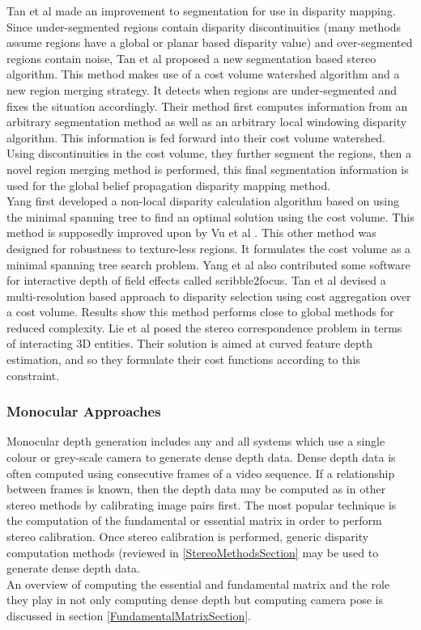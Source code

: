 Tan et al \cite{Tan14Stereo} made an improvement to segmentation for use in disparity mapping. Since under-segmented regions contain disparity discontinuities (many methods assume regions have a global or planar based disparity value) and over-segmented regions contain noise, Tan et al proposed a new segmentation based stereo algorithm. This method makes use of a cost volume watershed algorithm and a new region merging strategy. It detects when regions are under-segmented and fixes the situation accordingly. Their method first computes information from an arbitrary segmentation method as well as an arbitrary local windowing disparity algorithm. This information is fed forward into their cost volume watershed. Using discontinuities in the cost volume, they further segment the regions, then a novel region merging method is performed, this final segmentation information is used for the global belief propagation disparity mapping method. \\


Yang \cite{Yang14Pattern} first developed a non-local disparity calculation algorithm based on using the minimal spanning tree to find an optimal solution using the cost volume. This method is supposedly improved upon by Vu et al \cite{Vu14Efficient}. This other method was designed for robustness to texture-less regions. It formulates the cost volume as a minimal spanning tree search problem. Yang et al also contributed some software for interactive depth of field effects called scribble2focus. Tan et al \cite{Tan14Soft} devised a multi-resolution based approach to disparity selection using cost aggregation over a cost volume. Results show this method performs close to global methods for reduced complexity. Lie et al \cite{Liu143d} posed the stereo correspondence problem in terms of interacting 3D entities. Their solution is aimed at curved feature depth estimation, and so they formulate their cost functions according to this constraint. \\



\subsubsection{Monocular Approaches}

Monocular depth generation includes any and all systems which use a single colour or grey-scale camera to generate dense depth data. Dense depth data is often computed using consecutive frames of a video sequence. If a relationship between frames is known, then the depth data may be computed as in other stereo methods by calibrating image pairs first. The most popular technique is the computation of the fundamental or essential matrix in order to perform stereo calibration. Once stereo calibration is performed, generic disparity computation methods (reviewed in \ref{StereoMethodsSection} may be used to generate dense depth data. \\

An overview of computing the essential and fundamental matrix and the role they play in not only computing dense depth but computing camera pose is discussed in section \ref{FundamentalMatrixSection}. 

